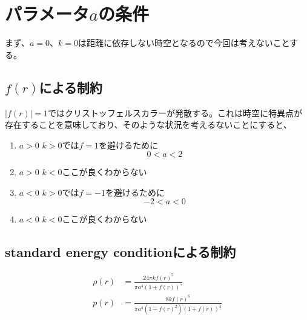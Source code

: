 \documentclass[dvipdfmx]{report} %
\begin{document}
\section{パラメータ$a$の条件}
まず、$a=0$、$k=0$は距離に依存しない時空となるので今回は考えないことする。
\subsection{$f(r)$による制約}
$ |f(r)|=1 $ではクリストッフェルスカラーが発散する。これは時空に特異点が存在することを意味しており、そのような状況を考えるないことにすると、
\begin{enumerate}[(1)\,]
\item{$a>0$  $k>0$では$f=1$を避けるために}
\[0 < a < 2\]
\item{$a>0$  $k<0$ここが良くわからない}
\item{$a<0$  $k>0$では$f=-1$を避けるために}
\[-2 < a < 0\]
\item{$a<0$  $k<0$ここが良くわからない}
\end{enumerate}

\subsection{standard energy conditionによる制約}
\begin{equation*}
\begin{split}
	\rho(r) &= \frac{ 24 \pi k f(r)^5 }{ \pi a^4 ( 1 + f(r) )^5 }\\
	p(r) &= \frac{ 8 k f(r)^6 }{ \pi a^4 ( 1 - f(r)^2 )( 1 + f(r) )^4 }
\end{split}
\end{equation*}
\end{document}
